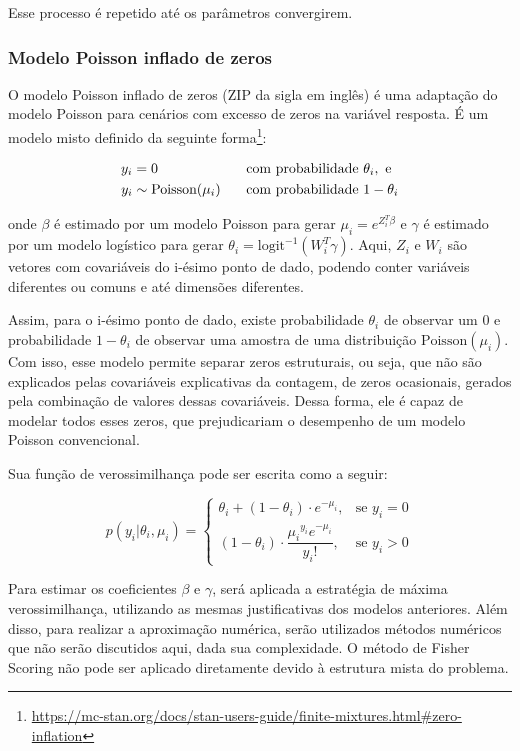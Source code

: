 \documentclass[
  twocolumn]{article}
\begin{document}
Esse processo é repetido até os parâmetros convergirem.

\subsubsection{Modelo Poisson inflado de
zeros}\label{modelo-poisson-inflado-de-zeros}

O modelo Poisson inflado de zeros (ZIP da sigla em inglês) é uma
adaptação do modelo Poisson para cenários com excesso de zeros na
variável resposta. É um modelo misto definido da seguinte
forma\footnote{\url{https://mc-stan.org/docs/stan-users-guide/finite-mixtures.html\#zero-inflation}}:

\[
\begin{aligned}
y_i = 0 \hspace{6em} &\text{ com probabilidade } \theta_i, \text{ e} \\
y_i \sim \text{Poisson}(\mu_i) \hspace{1.5em} &\text{  com probabilidade } 1-\theta_i
\end{aligned}
\]

onde \(\beta\) é estimado por um modelo Poisson para gerar
\(\mu_i = e^{Z_i^T\beta}\) e \(\gamma\) é estimado por um modelo
logístico para gerar \(\theta_i = \text{logit}^{-1}(W_i^T\gamma)\).
Aqui, \(Z_i\) e \(W_i\) são vetores com covariáveis do i-ésimo ponto de
dado, podendo conter variáveis diferentes ou comuns e até dimensões
diferentes.

Assim, para o i-ésimo ponto de dado, existe probabilidade \(\theta_i\)
de observar um 0 e probabilidade \(1-\theta_i\) de observar uma amostra
de uma distribuição \(\text{Poisson}(\mu_i)\). Com isso, esse modelo
permite separar zeros estruturais, ou seja, que não são explicados pelas
covariáveis explicativas da contagem, de zeros ocasionais, gerados pela
combinação de valores dessas covariáveis. Dessa forma, ele é capaz de
modelar todos esses zeros, que prejudicariam o desempenho de um modelo
Poisson convencional.

Sua função de verossimilhança pode ser escrita como a seguir:

\[
p(y_i | \theta_i, \mu_i) = 
\begin{cases}
\theta_i + (1-\theta_i) \cdot e^{-\mu_i}, & \text{se } y_i = 0 \\
(1-\theta_i) \cdot \dfrac{{\mu_i}^{y_i} e^{-\mu_i}}{y_i!}, & \text{se } y_i > 0
\end{cases}
\]

Para estimar os coeficientes \(\beta\) e \(\gamma\), será aplicada a
estratégia de máxima verossimilhança, utilizando as mesmas
justificativas dos modelos anteriores. Além disso, para realizar a
aproximação numérica, serão utilizados métodos numéricos que não serão
discutidos aqui, dada sua complexidade. O método de Fisher Scoring não
pode ser aplicado diretamente devido à estrutura mista do problema.
\end{document}
